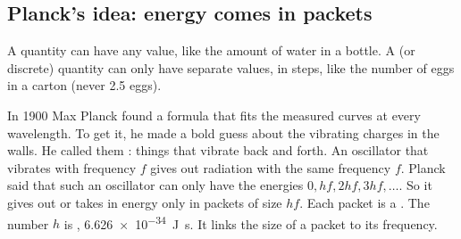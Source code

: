 \subsection{Planck's idea: energy comes in packets}

A  quantity can have any value, like the amount of water in a
bottle. A  (or discrete) quantity can only have separate values, in
steps, like the number of eggs in a carton (never 2.5 eggs).

In 1900 Max Planck found a formula that fits the measured curves at every
wavelength. To get it, he made a bold guess about the vibrating charges in the
walls. He called them : things that vibrate back and forth. An
oscillator that vibrates with frequency $f$ gives out radiation with the same
frequency $f$. Planck said that such an oscillator can only have the energies
$0, hf, 2hf, 3hf, \ldots$. So it gives out or takes in energy only in packets of
size $hf$. Each packet is a . The number $h$ is , \qty{6.626e-34}{J.s}. It links the size of a packet to its frequency.

